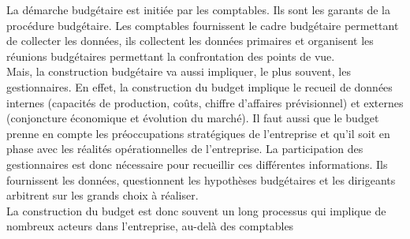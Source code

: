 \documentclass{tufte-handout}
\begin{document}
La démarche budgétaire est initiée par les comptables. Ils sont les garants de la procédure budgétaire. Les comptables fournissent le cadre budgétaire permettant de collecter les données, ils collectent les données primaires et organisent les réunions budgétaires permettant la confrontation des points de vue.\\
Mais, la construction budgétaire va aussi impliquer, le plus souvent, les gestionnaires. En effet, la construction du budget implique le recueil de données internes (capacités de production, coûts, chiffre d'affaires prévisionnel) et externes (conjoncture économique et évolution du marché). Il faut aussi que le budget prenne en compte les préoccupations stratégiques de l'entreprise et qu'il soit en phase avec les réalités opérationnelles de l'entreprise. La participation des gestionnaires est donc nécessaire pour recueillir ces différentes informations. Ils fournissent les données, questionnent les hypothèses budgétaires et les dirigeants arbitrent sur les grands choix à réaliser.\\
La construction du budget est donc souvent un long processus qui implique de nombreux acteurs dans l'entreprise, au-delà des comptables\\
\end{document}
